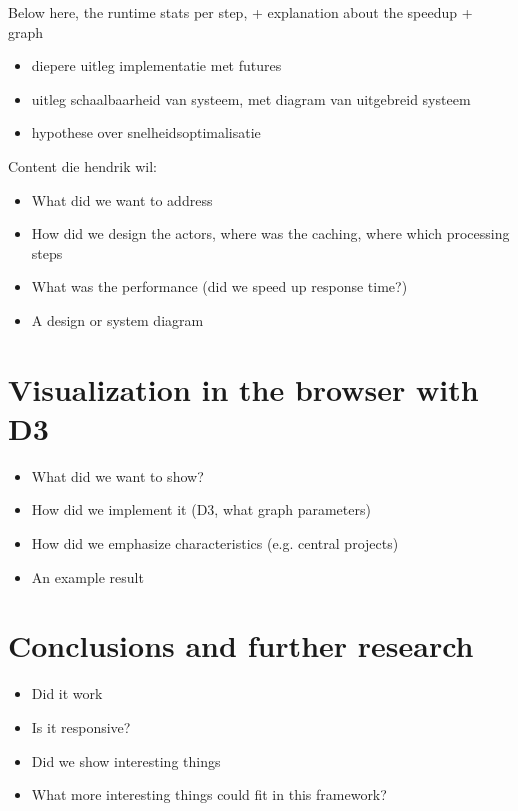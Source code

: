 \documentclass[10pt,a4paper]{article}
\begin{document}
Below here, the runtime stats per step, + explanation about the speedup + graph



\begin{itemize}
	\item diepere uitleg implementatie met futures
	\item uitleg schaalbaarheid van systeem, met diagram van uitgebreid systeem
	\item hypothese over snelheidsoptimalisatie
\end{itemize}


Content die hendrik wil:

\begin{itemize}
    \item What did we want to address
    \item How did we design the actors, where was the caching, where which processing steps
    \item What was the performance (did we speed up response time?)
    \item A design or system diagram
\end{itemize}

\section{Visualization in the browser with D3}\label{sec:visualization}

\begin{itemize}
    \item What did we want to show?
    \item How did we implement it (D3, what graph parameters)
    \item How did we emphasize characteristics (e.g. central projects)
    \item An example result
\end{itemize}

\section{Conclusions and further research}\label{sec:conclusions}

\begin{itemize}
    \item Did it work
    \item Is it responsive?
    \item Did we show interesting things
    \item What more interesting things could fit in this framework?
\end{itemize}
\end{document}
